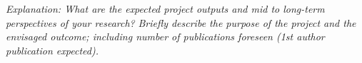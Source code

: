 % 
% 

\emph{Explanation: What are the expected project outputs and mid to long-term
perspectives of your research?}
\emph{Briefly describe the purpose of the project and the envisaged outcome;
  including number of publications foreseen (1st author publication expected).} 



% 
